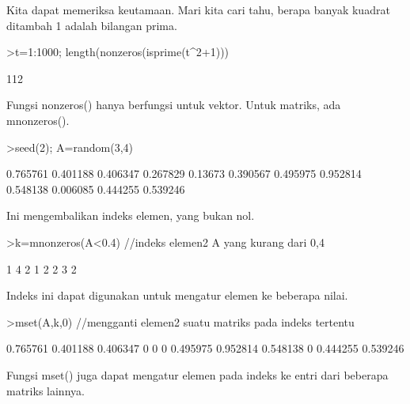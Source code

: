 \documentclass[a4paper,10pt]{article}
\begin{document}
\begin{eulernotebook}
\begin{eulercomment}
\begin{eulercomment}
\begin{eulercomment}
\begin{eulercomment}
\begin{eulercomment}
Kita dapat memeriksa keutamaan. Mari kita cari tahu, berapa banyak
kuadrat ditambah 1 adalah bilangan prima.
\end{eulercomment}
\begin{eulerprompt}
>t=1:1000; length(nonzeros(isprime(t^2+1)))
\end{eulerprompt}
\begin{euleroutput}
  112
\end{euleroutput}
\begin{eulercomment}
Fungsi nonzeros() hanya berfungsi untuk vektor. Untuk matriks, ada
mnonzeros().
\end{eulercomment}
\begin{eulerprompt}
>seed(2); A=random(3,4)
\end{eulerprompt}
\begin{euleroutput}
       0.765761      0.401188      0.406347      0.267829 
        0.13673      0.390567      0.495975      0.952814 
       0.548138      0.006085      0.444255      0.539246 
\end{euleroutput}
\begin{eulercomment}
Ini mengembalikan indeks elemen, yang bukan nol.
\end{eulercomment}
\begin{eulerprompt}
>k=mnonzeros(A<0.4) //indeks elemen2 A yang kurang dari 0,4
\end{eulerprompt}
\begin{euleroutput}
              1             4 
              2             1 
              2             2 
              3             2 
\end{euleroutput}
\begin{eulercomment}
Indeks ini dapat digunakan untuk mengatur elemen ke beberapa nilai.
\end{eulercomment}
\begin{eulerprompt}
>mset(A,k,0) //mengganti elemen2 suatu matriks pada indeks tertentu
\end{eulerprompt}
\begin{euleroutput}
       0.765761      0.401188      0.406347             0 
              0             0      0.495975      0.952814 
       0.548138             0      0.444255      0.539246 
\end{euleroutput}
\begin{eulercomment}
Fungsi mset() juga dapat mengatur elemen pada indeks ke entri dari
beberapa matriks lainnya.
\end{eulercomment}
\begin{eulerprompt}

\end{eulerprompt}
\end{eulercomment}
\end{eulercomment}
\end{eulercomment}
\end{eulercomment}
\end{eulernotebook}
\end{document}
